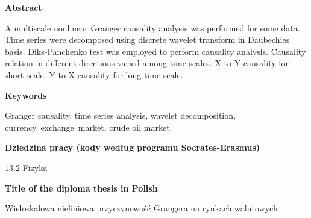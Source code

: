 \newpage
\begin{center}
\textbf{Abstract}
\end{center}

A multiscale nonlinear Granger causality analysis was performed for some data.
Time series were decomposed using discrete wavelet transform in Daubechies basis.
Diks-Panchenko test was employed to perform causality analysis.
Causality relation in different directions varied among time scales. X to Y causality for short scale. Y to X causality for long time scale.
\vspace{2.5cm}
\begin{center}

\textbf{Keywords}\vspace{0.3cm}

Granger causality, time series analysis, wavelet decomposition, \mbox{currency exchange market}, crude oil market.\\
\vspace{2.5cm}

\textbf{Dziedzina pracy (kody według programu Socrates-Erasmus)}\vspace{0.3cm}

13.2 Fizyka\\
\vspace{2.5cm}

\textbf{Title of the diploma thesis in Polish}\vspace{0.3cm}

Wieloskalowa nieliniowa przyczynowość Grangera na rynkach walutowych
\end{center}

